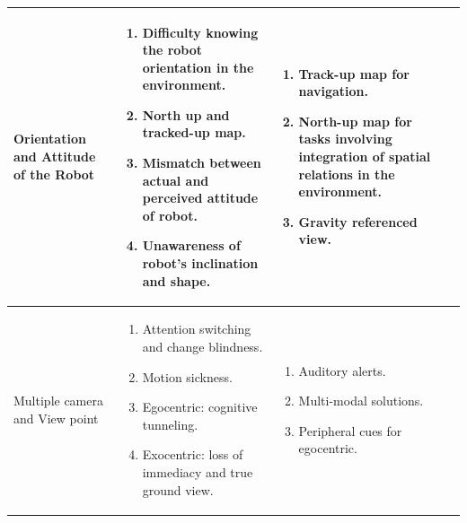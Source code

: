 \begin{longtable}{p{2.5cm} p{5cm} p{5cm} p{1cm}}
     \rowcolor{lightgray} Orientation and Attitude of the Robot &
           \begin{enumerate}
           \item Difficulty knowing the robot orientation in the environment.
           \item North up and tracked-up map.
           \item Mismatch between actual and perceived attitude of robot.
           \item Unawareness of robot's inclination and shape.
           \end{enumerate} &
            \begin{enumerate}
            \item Track-up map for navigation.
            \item North-up map for tasks involving integration of spatial relations in the environment.
            \item Gravity referenced view.
            \end{enumerate} &  \cite{wang2004gravity} \cite{Chen2007HumanPI} \cite{fitts1967human} \cite{drury2006changing}\\
        \hline
         Multiple camera  and View point &
           \begin{enumerate}
           \item Attention switching and change blindness.
           \item Motion sickness.
           \item Egocentric: cognitive tunneling.
           \item Exocentric: loss of immediacy and true ground view.
           
           \end{enumerate} &
            \begin{enumerate}
            \item Auditory alerts.
            \item Multi-modal solutions.
            \item Peripheral cues for egocentric.
            \end{enumerate} &  \cite{keyes2006camera} \cite{Chen2007HumanPI} \cite{olmos2000tactical} \cite{keyes2006camera} \cite{Chen2007HumanPI} \cite{olmos2000tactical}\\
        \hline


\end{longtable}
